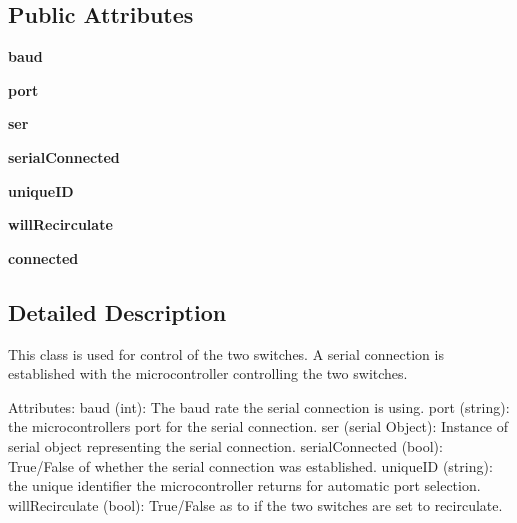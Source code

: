 \subsection*{Public Attributes}
\begin{DoxyCompactItemize}
\item 
\mbox{\label{class_two_switch_1_1_two_switch_a9fe7ee9555de6382e4be1419d7580203}} 
{\bfseries baud}
\item 
\mbox{\label{class_two_switch_1_1_two_switch_a125dcd40f5242394787f7f5b1f3cfe71}} 
{\bfseries port}
\item 
\mbox{\label{class_two_switch_1_1_two_switch_a8b0bb4497dcb4bdba19597fa296e698b}} 
{\bfseries ser}
\item 
\mbox{\label{class_two_switch_1_1_two_switch_a06a3303adcbe39405325e87cd7d2bd8f}} 
{\bfseries serial\+Connected}
\item 
\mbox{\label{class_two_switch_1_1_two_switch_a5facaddf7386248c105cedd41fb4812d}} 
{\bfseries unique\+ID}
\item 
\mbox{\label{class_two_switch_1_1_two_switch_a31490d5047814007931a7b700d028a12}} 
{\bfseries will\+Recirculate}
\item 
\mbox{\label{class_two_switch_1_1_two_switch_a643bdc6e214c03d08cba1b722be10e40}} 
{\bfseries connected}
\end{DoxyCompactItemize}


\subsection{Detailed Description}
\begin{DoxyVerb}This class is used for control of the two switches. A serial connection is established with the microcontroller controlling the two switches.

Attributes:
    baud (int): The baud rate the serial connection is using.
    port (string): the microcontrollers port for the serial connection.
    ser (serial Object): Instance of serial object representing the serial connection.
    serialConnected (bool): True/False of whether the serial connection was established.
    uniqueID (string): the unique identifier the microcontroller returns for automatic port selection.
    willRecirculate (bool): True/False as to if the two switches are set to recirculate.
\end{DoxyVerb}
 

